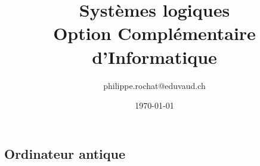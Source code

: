 \documentclass{book}
\title{Systèmes logiques \\[1ex] \large Option Complémentaire d'Informatique}
\author{philippe.rochat@eduvaud.ch }
\date{\today}
\theoremstyle{definition}
\theoremstyle{definition}
\begin{document}
\maketitle
\tableofcontents














\begin{appendix}


\chapter{Ordinateur antique}
%
\end{appendix}
\end{document}
